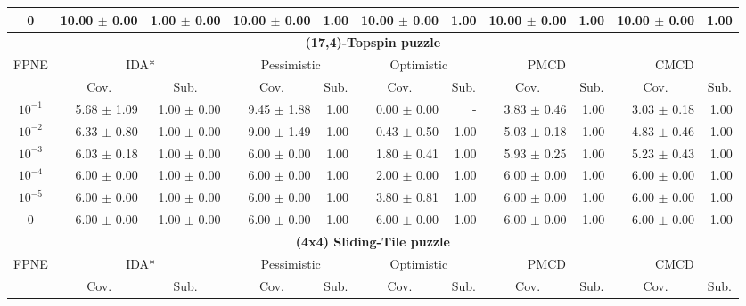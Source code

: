 \documentclass[letterpaper]{article}
\begin{document}
\begin{table}[t]
\begin{tabular}{| c | r  r | r  r | r  r | r  r | r  r |}
0 	& 10.00 $\pm$ 0.00	& 1.00  $\pm$ 0.00 	& 10.00 $\pm$ 0.00	& 1.00 	& 10.00 $\pm$ 0.00	& 1.00 	& 10.00 $\pm$ 0.00	& 1.00 	& 10.00 $\pm$ 0.00	& 1.00 	\\

\hline
\hline
\multicolumn{11}{|c|}{\textbf{(17,4)-Topspin puzzle}} \\
\hline
\multirow{2}{*}{FPNE}	& \multicolumn{2}{|c|}{IDA*} 	& \multicolumn{2}{|c|}{Pessimistic} 	& \multicolumn{2}{|c|}{Optimistic} 	& \multicolumn{2}{|c|}{PMCD} 	& \multicolumn{2}{|c|}{CMCD} 	\\
\cline{2-11}
& \multicolumn{1}{c}{Cov.} & \multicolumn{1}{c|}{Sub.} 	& \multicolumn{1}{c}{Cov.} & \multicolumn{1}{c|}{Sub.} 	& \multicolumn{1}{c}{Cov.} & \multicolumn{1}{c|}{Sub.} 	& \multicolumn{1}{c}{Cov.} & \multicolumn{1}{c|}{Sub.} 	& \multicolumn{1}{c}{Cov.} & \multicolumn{1}{c|}{Sub.} 	\\
\hline
$10^{-1}$	& 5.68 $\pm$ 1.09	& 1.00 $\pm$ 0.00	& 9.45 $\pm$ 1.88	& 1.00	& 0.00 $\pm$ 0.00	& - 	& 3.83 $\pm$ 0.46	& 1.00	& 3.03 $\pm$ 0.18	& 1.00	\\

$10^{-2}$	& 6.33 $\pm$ 0.80	& 1.00 $\pm$ 0.00	& 9.00 $\pm$ 1.49	& 1.00	& 0.43 $\pm$ 0.50	& 1.00	& 5.03 $\pm$ 0.18	& 1.00	& 4.83 $\pm$ 0.46	& 1.00	\\

$10^{-3}$	& 6.03 $\pm$ 0.18	& 1.00 $\pm$ 0.00	& 6.00 $\pm$ 0.00	& 1.00	& 1.80 $\pm$ 0.41	& 1.00	& 5.93 $\pm$ 0.25	& 1.00	& 5.23 $\pm$ 0.43	& 1.00	\\

$10^{-4}$	& 6.00 $\pm$ 0.00	& 1.00 $\pm$ 0.00	& 6.00 $\pm$ 0.00	& 1.00	& 2.00 $\pm$ 0.00	& 1.00	& 6.00 $\pm$ 0.00	& 1.00	& 6.00 $\pm$ 0.00	& 1.00	\\

$10^{-5}$	& 6.00 $\pm$ 0.00	& 1.00 $\pm$ 0.00	& 6.00 $\pm$ 0.00	& 1.00	& 3.80 $\pm$ 0.81	& 1.00	& 6.00 $\pm$ 0.00	& 1.00	& 6.00 $\pm$ 0.00	& 1.00	\\

0 	& 6.00 $\pm$ 0.00	& 1.00  $\pm$ 0.00 	& 6.00 $\pm$ 0.00	& 1.00 	& 6.00 $\pm$ 0.00	& 1.00 	& 6.00 $\pm$ 0.00	& 1.00 	& 6.00 $\pm$ 0.00	& 1.00 	\\



\hline
\hline
\multicolumn{11}{|c|}{\textbf{(4x4) Sliding-Tile puzzle}} \\
\hline
\multirow{2}{*}{FPNE}	& \multicolumn{2}{|c|}{IDA*} 	& \multicolumn{2}{|c|}{Pessimistic} 	& \multicolumn{2}{|c|}{Optimistic} 	& \multicolumn{2}{|c|}{PMCD} 	& \multicolumn{2}{|c|}{CMCD} 	\\
\cline{2-11}
& \multicolumn{1}{c}{Cov.} & \multicolumn{1}{c|}{Sub.} 	& \multicolumn{1}{c}{Cov.} & \multicolumn{1}{c|}{Sub.} 	& \multicolumn{1}{c}{Cov.} & \multicolumn{1}{c|}{Sub.} 	& \multicolumn{1}{c}{Cov.} & \multicolumn{1}{c|}{Sub.} 	& \multicolumn{1}{c}{Cov.} & \multicolumn{1}{c|}{Sub.} 	\\
\hline


\end{tabular}
\end{table}
\end{document}
